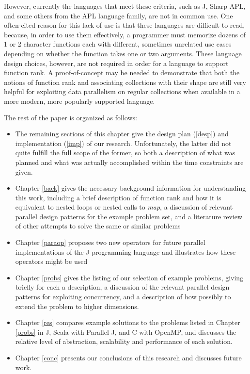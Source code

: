 However, currently the languages that meet these criteria, 
such as J, Sharp APL, and some others from the APL language family, 
are not in common use. 
One often-cited reason for this lack of use is that these languages are difficult to read, %
because, in order to use them effectively, a programmer must memorize 
dozens of 1 or 2 character functions each with different, sometimes unrelated use cases 
depending on whether the function takes one or two arguments\cite{jvocab}\cite{dapl}. 
These language design choices, however, 
are not required in order for a language to support function rank.
A proof-of-concept may be needed 
to demonstrate that both the notions of function rank
and associating collections with their shape
are still very helpful for exploiting data parallelism on regular collections 
when available in a more modern, more popularly supported language.

The rest of the paper is organized as follows:
\begin{itemize} 
	\item The remaining sections of this chapter give the design plan (\ref{desp}) and implementation (\ref{imp}) of our research. 
	Unfortunately, the latter did not quite fulfill the full scope of the former, 
	so both a description of what was planned and what was actually accomplished within the time constraints are given.
	\item Chapter \ref{back} gives the necessary background information for understanding this work, 
	including a brief description of function rank and how it is equivalent to nested loops or nested calls to \textit{map},
	a discussion of relevant parallel design patterns for the example problem set, 
	and a literature review of other attempts to solve the same or similar problems
	\item Chapter \ref{paraop} proposes two new operators for future parallel implementations of the J programming language 
		and illustrates how these operators might be used
    \item Chapter \ref{probs} gives the listing of our selection of example problems, giving briefly for each a description, a discussion of the relevant parallel design patterns for exploiting concurrency, and a description of how possibly to extend the problem to higher dimensions.
    \item Chapter \ref{res} compares example solutions to the problems listed in Chapter \ref{probs} 
		in J, Scala with Parallel-J, and C with OpenMP, 
		and discusses the relative level of abstraction, scalability and performance of each solution. 
    \item Chapter \ref{conc} presents our conclusions of this research and discusses future work. 
\end{itemize}

